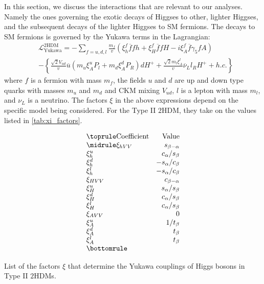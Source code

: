 In this section, we discuss the interactions that are relevant to our analyses. Namely the ones governing the exotic decays of Higgses to other, lighter Higgses, and the subsequent decays of the lighter Higgses to SM fermions. The decays to SM fermions is governed by the Yukawa terms in the Lagrangian:
\begin{align*}
&\mathcal{L}^{\mathrm{2HDM}}_{\text{Yukawa}} = - \sum_{f = u, d, l} \frac{m_f}{v}
\left(\xi_h^f \overline{f}fh+\xi_H^f \overline{f}fH-i\xi_A^f \overline{f}\gamma_5fA \right)\\
&-\left\{\frac{\sqrt{2}V_{ud}}{v}\overline{u}\left(m_u\xi_A^uP_l+m_d\xi_A^dP_R\right)dH^+ + \frac{\sqrt{2}m_l\xi^l_A}{v}\overline{\nu}_Ll_RH^+ + h.c.\right\}
\label{eq:2HDM_Yukawa_couplings}
\end{align*}
where $f$ is a fermion with mass $m_f$, the fields $u$ and $d$ are up and down type quarks with masses $m_u$ and $m_d$ and CKM mixing $V_{ud}$, $l$ is a lepton with mass $m_l$, and $\nu_L$ is a neutrino. 
The factors $\xi$ in the above expressions depend on the specific model being considered. For the Type II $2$HDM, they take on the values listed in \autoref{tab:xi_factors}.
\begin{margintable}[3in]
  \[
    \begin{array}{lr}
      \toprule
      \text{Coefficient}       & \text{Value} \\
      \midrule
      \xi_{hVV}   & \sbma          \\
      \xi_{h}^u   & \casb          \\
      \xi_{h}^d   & -\sacb         \\
      \xi_{h}^l   & -\sacb         \\
      \xi_{HVV}   & \cbma          \\
      \xi_{H}^u   & \sasb          \\
      \xi_{H}^d   & \casb          \\
      \xi_{H}^l   & \casb          \\
      \xi_{AVV}   & 0              \\
      \xi_{A}^u   & 1/t_\beta      \\
      \xi_{A}^d   & t_\beta        \\
      \xi_{A}^l   & t_\beta\\      
      \bottomrule
\end{array}
\]
\caption{List of the factors $\xi$ that determine the Yukawa couplings of Higgs bosons in Type II $2$HDMs.}
\label{tab:xi_factors}
\end{margintable}

